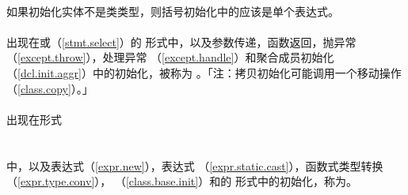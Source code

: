 \paragraph{}
如果初始化实体不是类类型，则括号初始化中的应该是单个表达式。

\paragraph{}
出现在或（\ref{stmt.select}）的
\tm{=}形式中，以及参数传递，函数返回，抛异常（\ref{except.throw}），处理异常
（\ref{except.handle}）和聚合成员初始化（\ref{dcl.init.aggr}）中的初始化，被称为
。「注：拷贝初始化可能调用一个移动操作（\ref{class.copy}）。」

\paragraph{}
出现在形式                                                                    \\
\mbox{\qquad{}} \\
\mbox{\qquad{}} \\
中，以及表达式（\ref{expr.new}），表达式
（\ref{expr.static.cast}），函数式类型转换（\ref{expr.type.conv}），
（\ref{class.base.init}）和的
形式中的初始化，称为。

